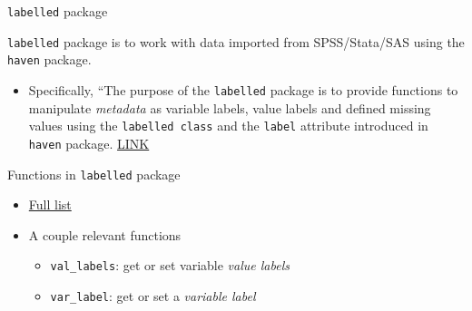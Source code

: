 \documentclass[8pt,ignorenonframetext,dvipsnames]{beamer}
\newenvironment{Shaded}{\begin{snugshade}}{\end{snugshade}}
\newcommand{\KeywordTok}[1]{\textcolor[rgb]{0.13,0.29,0.53}{\textbf{#1}}}
\newcommand{\StringTok}[1]{\textcolor[rgb]{0.31,0.60,0.02}{#1}}
\newcommand{\OperatorTok}[1]{\textcolor[rgb]{0.81,0.36,0.00}{\textbf{#1}}}
\newcommand{\NormalTok}[1]{#1}
\providecommand{\tightlist}{%
  \setlength{\itemsep}{0pt}\setlength{\parskip}{0pt}}
\renewcommand{\textbf}[1]{{\color{darkgray}\bfseries\fontfamily{Montserrat-TOsF}#1}}
\begin{document}
\begin{frame}[fragile]{\texttt{labelled} package}

\texttt{labelled} package is to work with data imported from
SPSS/Stata/SAS using the \texttt{haven} package.

\begin{itemize}
\tightlist
\item
  Specifically, ``The purpose of the \texttt{labelled} package is to
  provide functions to manipulate \emph{metadata} as variable labels,
  value labels and defined missing values using the
  \texttt{labelled\ class} and the \texttt{label} attribute introduced
  in \texttt{haven} package.
  \href{https://cran.r-project.org/web/packages/labelled/vignettes/intro_labelled.html}{LINK}
\end{itemize}

Functions in \texttt{labelled} package

\begin{itemize}
\tightlist
\item
  \href{https://www.rdocumentation.org/packages/labelled/versions/1.1.0}{Full
  list}
\item
  A couple relevant functions

  \begin{itemize}
  \tightlist
  \item
    \texttt{val\_labels}: get or set variable \emph{value labels}
  \item
    \texttt{var\_label}: get or set a \emph{variable label}
  \end{itemize}
\end{itemize}

\begin{Shaded}
\end{Shaded}

\end{frame}
\end{document}
